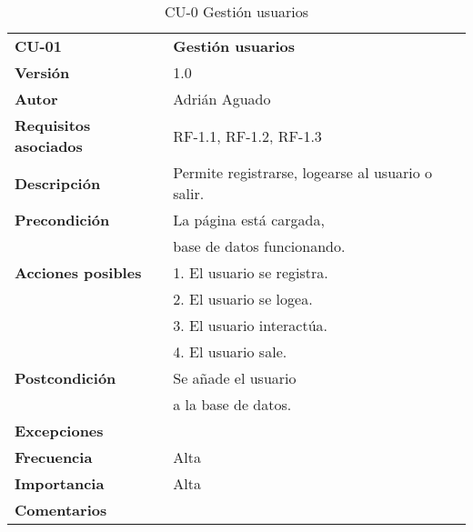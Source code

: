 \begin{table}
\begin{tabular}{llr}  
\toprule
\begin{minipage}[b]{0.24\columnwidth}\raggedright\strut
\textbf{CU-01}\strut
\end{minipage} & \begin{minipage}[b]{0.72\columnwidth}\raggedright\strut
\textbf{Gestión usuarios}\strut
\end{minipage}\tabularnewline
\cmidrule(r){1-2}
\textbf{Versión}       & 1.0           \\
\textbf{Autor}       & Adrián  Aguado    \\
\textbf{Requisitos asociados}       & RF-1.1, RF-1.2, RF-1.3 \\ 
\textbf{Descripción} & Permite registrarse, logearse al usuario o salir.\\
\textbf{Precondición} & La página está cargada, \\
& base de datos funcionando.       \\
\textbf{Acciones posibles} & 1. El usuario se registra. \\
& 2. El usuario  se logea. \\
& 3. El usuario interactúa.\\
& 4. El usuario sale.        \\
\textbf{Postcondición} & Se añade el usuario \\
& a la base de datos.     \\
\textbf{Excepciones} &  \\
\textbf{Frecuencia} & Alta            \\
\textbf{Importancia} & Alta            \\
\textbf{Comentarios } &       \\
\bottomrule
\end{tabular}
\caption{CU-0 Gestión usuarios} 
\end{table}

